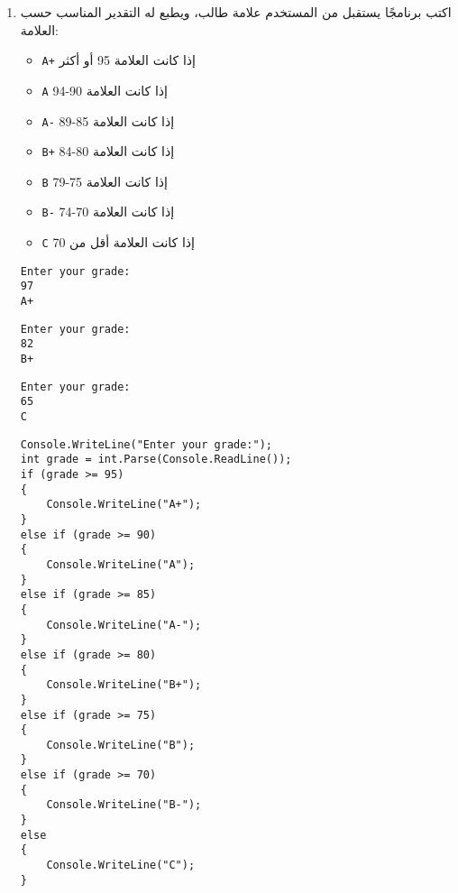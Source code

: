 ﻿\documentclass[12pt]{article}
\begin{document}
\begin{enumerate}[itemsep=3em]
\begin{enumerate}
\item
اكتب برنامجًا يستقبل من المستخدم علامة طالب، ويطبع له التقدير المناسب حسب العلامة:
\begin{itemize}
\item \texttt{A+} إذا كانت العلامة 95 أو أكثر
\item \texttt{A} إذا كانت العلامة 90-94
\item \texttt{A-} إذا كانت العلامة 85-89
\item \texttt{B+} إذا كانت العلامة 80-84
\item \texttt{B} إذا كانت العلامة 75-79
\item \texttt{B-} إذا كانت العلامة 70-74
\item \texttt{C} إذا كانت العلامة أقل من 70
\end{itemize}%
\ifdetailed
\begin{boxExample}[1]
\begin{english}
\begin{verbatim}
Enter your grade:
97
A+
\end{verbatim}
\end{english}
\end{boxExample}
\begin{boxExample}[2]
\begin{english}
\begin{verbatim}
Enter your grade:
82
B+
\end{verbatim}
\end{english}
\end{boxExample}
\begin{boxExample}[3]
\begin{english}
\begin{verbatim}
Enter your grade:
65
C
\end{verbatim}
\end{english}
\end{boxExample}

\ifwithsols
\begin{boxSolution}
\begin{english}
\begin{verbatim}
Console.WriteLine("Enter your grade:");
int grade = int.Parse(Console.ReadLine());
if (grade >= 95)
{
    Console.WriteLine("A+");
}
else if (grade >= 90)
{
    Console.WriteLine("A");
}
else if (grade >= 85)
{
    Console.WriteLine("A-");
}
else if (grade >= 80)
{
    Console.WriteLine("B+");
}
else if (grade >= 75)
{
    Console.WriteLine("B");
}
else if (grade >= 70)
{
    Console.WriteLine("B-");
}
else
{
    Console.WriteLine("C");
}
\end{verbatim}
\end{english}
\end{boxSolution}
\clearpage
\fi
\fi


\end{enumerate}
\end{enumerate}
\end{document}
